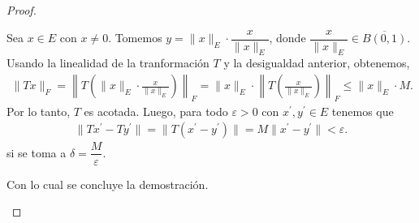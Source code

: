 \begin{proof}
\begin{itemize}
    Sea $x \in E$ con $x \neq 0$. Tomemos $y = \|x\|_E \cdot \dfrac{x}{\|x\|_E}$, donde $ \dfrac{x}{\|x\|_E}\in \overline{B(0,1)}$. Usando la linealidad de la tranformación $T$ y la desigualdad anterior, obtenemos,
    \begin{align*}
      \|T x\|_F = \left\| T\left( \|x\|_E \cdot \frac{x}{\|x\|_E} \right) \right\|_F = \|x\|_E \cdot \left\| T\left( \frac{x}{\|x\|_E} \right) \right\|_F \leq \|x\|_E \cdot M 
    .\end{align*}
    Por lo tanto, $T$ es acotada. Luego, para todo $\varepsilon>0$ con $x^{\prime}, y^{\prime}\in E$ tenemos que 
    \begin{align*}
        \|Tx^{\prime}-Ty^{\prime}\|=\|T(x^{\prime}-y^{\prime})\|=M\|x^{\prime}-y^{\prime} \|<\varepsilon
    .\end{align*}
    si se toma a $\delta= \dfrac{M}{\varepsilon}$.


    Con lo cual se concluye la demostración.

\end{itemize}

   


\end{proof}